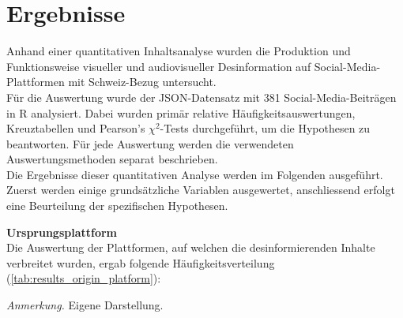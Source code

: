 \documentclass[12pt,a4paper]{article}        %
\begin{document}
\pagebreak
\section{Ergebnisse}
Anhand einer quantitativen Inhaltsanalyse wurden die Produktion und Funktionsweise visueller und audiovisueller Desinformation auf Social-Media-Plattformen mit Schweiz-Bezug untersucht.\\
Für die Auswertung wurde der JSON-Datensatz mit 381 Social-Media-Beiträgen in R analysiert. Dabei wurden primär relative Häufigkeitsauswertungen, Kreuztabellen und Pearson’s \(\chi^2\)-Tests durchgeführt, um die Hypothesen zu beantworten. Für jede Auswertung werden die verwendeten Auswertungsmethoden separat beschrieben.\\ Die Ergebnisse dieser quantitativen Analyse werden im Folgenden ausgeführt. Zuerst werden einige grundsätzliche Variablen ausgewertet, anschliessend erfolgt eine Beurteilung der spezifischen Hypothesen.

\textbf{Ursprungsplattform}\\
Die Auswertung der Plattformen, auf welchen die desinformierenden Inhalte verbreitet wurden, ergab folgende Häufigkeitsverteilung (\ref{tab:results_origin_platform}):

\begin{table}[H]
  \caption{\textit{Relative Häufigkeitsverteilung der Ursprungsplattformen der desinformierenden Beiträge in \%.}}
  \label{tab:results_origin_platform}
  \centering
  \footnotesize\textit{Anmerkung.} Eigene Darstellung.
\end{table}
\end{document}
